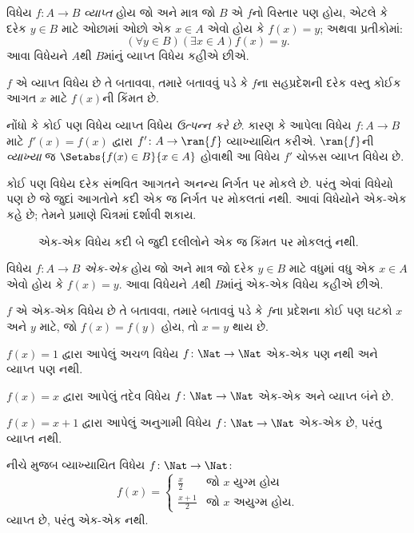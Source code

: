 \begin{defn}[વ્યાપ્ત વિધેય]
વિધેય $f \colon A \rightarrow B$ \emph{વ્યાપ્ત}
હોય જો અને માત્ર જો $B$ એ $f$નો વિસ્તાર પણ હોય, એટલે કે
દરેક $y \in B$ માટે ઓછામાં ઓછો એક $x \in A$
એવો હોય કે $f(x) = y$; અથવા પ્રતીકોમાં:
\[
  (\forall y \in B)(\exists x \in A)f(x) = y.
\]
આવા વિધેયને $A$થી $B$માંનું વ્યાપ્ત વિધેય કહીએ છીએ.
\end{defn}

\begin{explain}
$f$ એ વ્યાપ્ત વિધેય છે તે બતાવવા, તમારે બતાવવું પડે
કે $f$ના સહપ્રદેશની દરેક વસ્તુ કોઈક આગત $x$ માટે
$f(x)$ની કિંમત છે.

નોંધો કે કોઈ પણ વિધેય વ્યાપ્ત વિધેય
\emph{ઉત્પન્ન કરે છે}. કારણ કે આપેલા વિધેય
$f \colon A \to B$ માટે $f'(x) = f(x)$ દ્વારા
$f' \colon A \to \ran{f}$ વ્યાખ્યાયિત કરીએ.
$\ran{f}$ની \emph{વ્યાખ્યા} જ
$\Setabs{f(x) \in B}{x \in A}$ હોવાથી આ વિધેય
$f'$ ચોક્કસ વ્યાપ્ત વિધેય છે.
\end{explain}

\begin{explain}
કોઈ પણ વિધેય દરેક સંભવિત આગતને અનન્ય નિર્ગત પર મોકલે છે.
પરંતુ એવાં વિધેયો પણ છે જે જુદાં આગતોને કદી એક જ
નિર્ગત પર મોકલતાં નથી. આવાં વિધેયોને એક-એક
કહે છે; તેમને  પ્રમાણે ચિત્રમાં
દર્શાવી શકાય.
\begin{figure}
  \caption{એક-એક વિધેય કદી બે જુદી દલીલોને
    એક જ કિંમત પર મોકલતું નથી.}
\end{figure}
\end{explain}

\begin{defn}[એક-એક વિધેય]
વિધેય $f \colon A \rightarrow B$ \emph{એક-એક}
હોય જો અને માત્ર જો દરેક $y \in B$ માટે વધુમાં વધુ
એક $x \in A$ એવો હોય કે $f(x) = y$.
આવા વિધેયને $A$થી $B$માંનું એક-એક વિધેય કહીએ છીએ.
\end{defn}

\begin{explain}
$f$ એ એક-એક વિધેય છે તે બતાવવા, તમારે બતાવવું પડે
કે $f$ના પ્રદેશના કોઈ પણ ઘટકો $x$ અને $y$
માટે, જો $f(x)=f(y)$ હોય, તો $x=y$ થાય છે.
\end{explain}

\begin{ex}
$f(x) = 1$ દ્વારા આપેલું અચળ વિધેય
$f\colon \Nat \to \Nat$ એક-એક પણ નથી
અને વ્યાપ્ત પણ નથી.

$f(x) = x$ દ્વારા આપેલું તદેવ વિધેય
$f\colon \Nat \to \Nat$ એક-એક અને
વ્યાપ્ત બંને છે.

$f(x) = x+1$ દ્વારા આપેલું અનુગામી વિધેય
$f \colon \Nat \to \Nat$ એક-એક છે,
પરંતુ વ્યાપ્ત નથી.

નીચે મુજબ વ્યાખ્યાયિત વિધેય $f \colon \Nat \to \Nat$:
\[
  f(x) =
  \begin{cases}
    \frac{x}{2} & \text{જો $x$ યુગ્મ હોય} \\
    \frac{x+1}{2} & \text{જો $x$ અયુગ્મ હોય.}
  \end{cases}
\]
વ્યાપ્ત છે, પરંતુ એક-એક નથી.
\end{ex}

